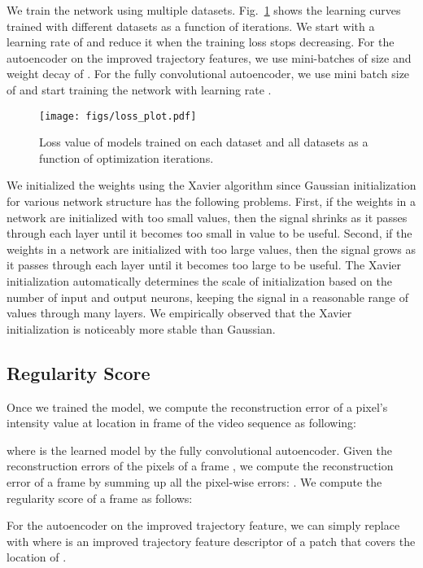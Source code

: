 \documentclass[10pt,twocolumn,letterpaper]{article}
\begin{document}
We train the network using multiple datasets.
Fig.~\ref{fig:loss_datasets} shows the learning curves trained with different datasets as a function of iterations.
We start with a learning rate of  and reduce it when the training loss stops decreasing.
For the autoencoder on the improved trajectory features, we use mini-batches of size  and weight decay of . 
For the fully convolutional autoencoder, we use mini batch size of  and start training the network with learning rate . 

\begin{figure}[h]
	\centering
		\texttt{[image: figs/loss\_plot.pdf]}
	\caption{Loss value of models trained on each dataset and all datasets as a function of optimization iterations.}
	\label{fig:loss_datasets}
	\vspace{-3mm}
\end{figure}


We initialized the weights using the Xavier algorithm \cite{glorot2010understanding} since Gaussian initialization for various network structure has the following problems.
First, if the weights in a network are initialized with too small values, then the signal shrinks as it passes through each layer until it becomes too small in value to be useful. 
Second, if the weights in a network are initialized with too large values, then the signal grows as it passes through each layer until it becomes too large to be useful.
The Xavier initialization automatically determines the scale of initialization based on the number of input and output neurons, keeping the signal in a reasonable range of values through many layers. 
We empirically observed that the Xavier initialization is noticeably more stable than Gaussian.


\subsection{Regularity Score}
Once we trained the model, we compute the reconstruction error of a pixel's intensity value  at location  in frame  of the video sequence as following:

where  is the learned model by the fully convolutional autoencoder. Given the reconstruction errors of the pixels of a frame , we compute the reconstruction error of a frame by summing up all the pixel-wise errors: . We compute the regularity score  of a frame  as follows:

For the autoencoder on the improved trajectory feature, we can simply replace  with  where  is an improved trajectory feature descriptor of a patch that covers the location of .
 
\end{document}
